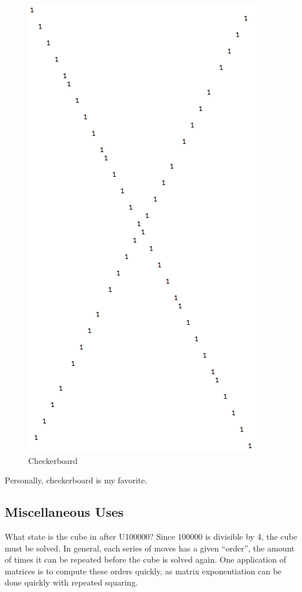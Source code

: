 \documentclass[11pt, oneside]{article}
\theoremstyle{plain}
\begin{document}
\begin{figure}[h!]
\centering
\includegraphics[scale=0.3]{checker}
\caption{Checkerboard}
\end{figure}

Personally, checkerboard is my favorite.

\newpage

\subsection{Miscellaneous Uses}

What state is the cube in after U100000? Since 100000 is divisible by 4, the
cube must be solved. In general, each series of moves has a given ``order'',
the amount of times it can be repeated before the cube is solved again.
One application of matrices is to compute these orders quickly, as matrix
exponentiation can be done quickly with repeated squaring.
\end{document}
